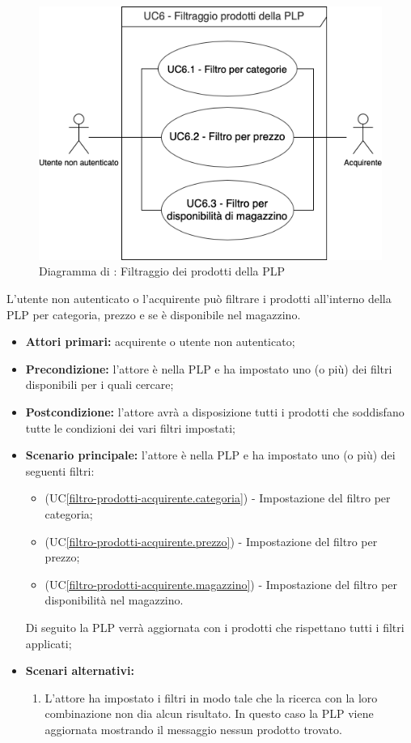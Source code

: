 \begin{figure}[H]
    \centering
    \includegraphics[scale=0.6]{Immagini/DiagrammiUC/Acquirente/FiltraggioProdotti.png}
    \caption{Diagramma di \actualUC: Filtraggio dei prodotti della PLP}
    \label{fig:filtro-prodotti-acquirente}
\end{figure}

L'utente non autenticato o l'acquirente può filtrare i prodotti all'interno della PLP per categoria, prezzo e se è disponibile nel magazzino.
\begin{itemize}
    \item \textbf{Attori primari:} acquirente o utente non autenticato;
    \item \textbf{Precondizione:} l'attore è nella PLP e ha impostato uno (o più) dei filtri disponibili per i quali cercare;
    \item \textbf{Postcondizione:} l'attore avrà a disposizione tutti i prodotti che soddisfano tutte le condizioni dei vari filtri impostati;
    \item \textbf{Scenario principale:} l'attore è nella PLP e ha impostato uno (o più) dei seguenti filtri:
    \begin{itemize}
        \item (UC\ref{filtro-prodotti-acquirente.categoria}) - Impostazione del filtro per categoria;
        \item (UC\ref{filtro-prodotti-acquirente.prezzo}) - Impostazione del filtro per prezzo;
        \item (UC\ref{filtro-prodotti-acquirente.magazzino}) - Impostazione del filtro per disponibilità nel magazzino.
    \end{itemize}
    Di seguito la PLP verrà aggiornata con i prodotti che rispettano tutti i filtri applicati;
    \item \textbf{Scenari alternativi:}
    \begin{enumerate}[label=\lett]
        \item L'attore ha impostato i filtri in modo tale che la ricerca con la loro combinazione non dia alcun risultato. In questo caso la PLP viene aggiornata mostrando il messaggio nessun prodotto trovato.
    \end{enumerate}
\end{itemize}

